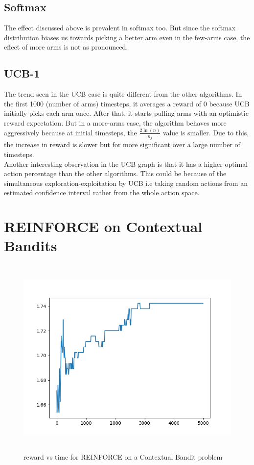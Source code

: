 \documentclass[12pt]{extarticle}
\begin{document}
\subsection{Softmax}
The effect discussed above is prevalent in softmax too. But since the softmax distribution biases us towards picking a better arm even in the few-arms case, the effect of more arms is not as pronounced.

\subsection{UCB-1}
The trend seen in the UCB case is quite different from the other algorithms. In the first 1000 (number of arms) timesteps, it averages a reward of 0 because UCB initially picks each arm once. After that, it starts pulling arms with an optimistic reward expectation. But in a more-arms case, the algorithm behaves more aggressively because at initial timesteps, the $\frac{2\ln(n)}{n_j}$ value is smaller. Due to this, the increase in reward is slower but for more significant over a large number of timesteps.\\
Another interesting observation in the UCB graph is that it has a higher optimal action percentage than the other algorithms. This could be because of the simultaneous exploration-exploitation by UCB i.e taking random actions from an estimated confidence interval rather from the whole action space.

\section{REINFORCE on Contextual Bandits}
\begin{figure}[H]
	\includegraphics[width=\textwidth, height=10cm]{reinforce.png}
	\caption{reward vs time for REINFORCE on a Contextual Bandit problem}
	\label{fig:reinforce}
\end{figure}
 
\end{document}
